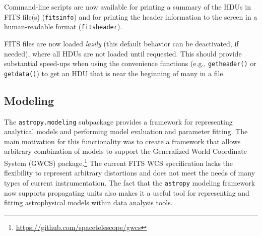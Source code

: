 \documentclass[modern]{aastex61}
\newcommand{\package}[1]{\texttt{#1}\xspace}
\newcommand{\astropypkg}{\package{astropy}}
\newcommand{\inlinecomment}[2]{\todo[inline]{#1: #2}\xspace}
\begin{document}
Command-line scripts are now available for printing a summary of the HDUs in
FITS file(s) (\texttt{fitsinfo}) and for printing the header information to
the screen in a human-readable format (\texttt{fitsheader}).

FITS files are now loaded \emph{lazily} (this default behavior can be
deactivated, if needed), where all HDUs are not loaded until
requested. This should provide substantial speed-ups when using the
convenience functions (e.g., \texttt{getheader()} or \texttt{getdata()}) to
get an HDU that is near the beginning of many in a file.






\subsection{Modeling}
\label{sec:modeling}

The \package{astropy.modeling} subpackage provides a framework for representing
analytical models and performing model evaluation and parameter fitting.
The main motivation for this functionality was to create a framework that
allows arbitrary combination of models to support the Generalized World
Coordinate System (GWCS) package.\footnote{\url{https://github.com/spacetelescope/gwcs}}
The current FITS WCS specification lacks the flexibility to represent
arbitrary distortions and does not meet the needs of many types of current instrumentation.
The fact that the \astropypkg modeling framework now supports propagating
units also makes it a useful tool for representing and fitting astrophysical
models within data analysis tools.
\end{document}
